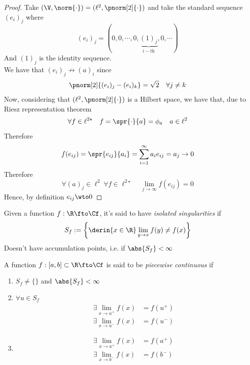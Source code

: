 \documentclass[../mmf.tex]{subfiles}
\begin{document}
\begin{proof}
	Take $(\V,\norm{\cdot})=(\ell^2,\pnorm[2]{\cdot})$ and take the standard sequence $(e_i)_j$ where
	\begin{equation*}
		(e_i)_j=(0,0,\cdots,0,\underbrace{(1)_j}_{i-\text{th}},0,\cdots)
	\end{equation*}
	And $(1)_j$ is the identity sequence.\\
	We have that $(e_i)_j\not\to(a)_i$ since
	\begin{equation*}
		\pnorm[2]{(e_i)_j-(e_i)_k}=\sqrt{2}\quad\forall j\ne k
	\end{equation*}
	Now, considering that $(\ell^2,\pnorm[2]{\cdot})$ is a Hilbert space, we have that, due to Riesz representation theorem
	\begin{equation*}
		\forall f\in\ell^{2\star}\quad f=\spr{\cdot}{a}=\phi_a\quad a\in\ell^2
	\end{equation*}
	Therefore
	\begin{equation*}
		f(e_{ij})=\spr{e_{ij}}{a_i}=\sum_{i=1}^\infty a_ie_{ij}=a_j\to0
	\end{equation*}
	Therefore
	\begin{equation*}
		\forall(a)_j\in\ell^2\ \forall f\in\ell^{2\star}\quad\lim_{j\to\infty}f(e_{ij})=0
	\end{equation*}
	Hence, by definition $e_{ij}\wto0$
\end{proof}
\begin{dfn}
	Given a function $f:\R\fto\Cf$, it's said to have \textit{isolated singularities} if
	\begin{equation*}
		S_f:=\left\{ \derin{x\in\R}\lim_{y\to x}f(y)\ne f(x) \right\}
	\end{equation*}
	Doesn't have accumulation points, i.e. if $\abs{S_f}<\infty$
\end{dfn}
\begin{dfn}
	A function $f:[a,b]\subset\R\fto\Cf$ is said to be \textit{piecewise continuous} if
	\begin{enumerate}
	\item $S_f\ne\{\}$ and $\abs{S_f}<\infty$
	\item $\forall u\in S_f$
		\begin{equation}
			\begin{aligned}
				\exists\lim_{x\to u^+}f(x)&=f(u^+)\\
				\exists\lim_{x\to u^-}f(x)&=f(u^-)
			\end{aligned}
			\label{eq:pwcont1}
		\end{equation}
	\item \begin{equation}
			\begin{aligned}
				\exists\lim_{x\to a^+}f(x)&=f(a^+)\\
				\exists\lim_{x\to b^-}f(x)&=f(b^-)
			\end{aligned}
			\label{eq:pwcont2}
		\end{equation}
	\end{enumerate}
\end{dfn}
\end{document}
